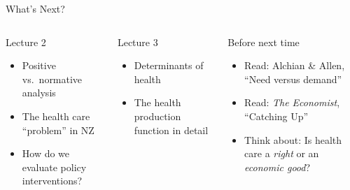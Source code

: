 \documentclass[aspectratio=169, 12pt]{beamer}
\begin{document}
\begin{frame}{What's Next?}
	\begin{columns}
		\begin{block}{Lecture 2}
			{\small\begin{itemize}\setlength{\itemsep}{0.1em}
				\item Positive vs.\ normative analysis
				\item The health care ``problem'' in NZ
				\item How do we evaluate policy interventions?
			\end{itemize}}
		\end{block}
		\vspace{0.3em}
		\begin{block}{Lecture 3}
			{\small\begin{itemize}\setlength{\itemsep}{0.1em}
				\item Determinants of health
				\item The health production function in detail
			\end{itemize}}
		\end{block}
		\begin{alertblock}{Before next time}
			{\footnotesize\begin{itemize}\setlength{\itemsep}{0.1em}
				\item Read: Alchian \& Allen, ``Need versus demand''
				\item Read: \textit{The Economist}, ``Catching Up''
				\item Think about: Is health care a \textit{right} or an \textit{economic good}?
			\end{itemize}}
		\end{alertblock}
	\end{columns}
\end{frame}
\end{document}
